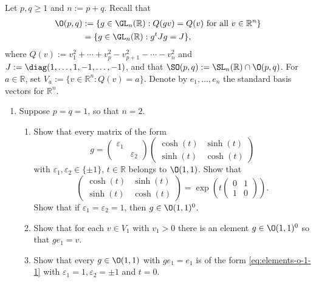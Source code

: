 \documentclass[reqno]{amsart} 
\def\eps{\varepsilon}
\begin{document}
\begin{homework}\label{hw:2}
  Let $p, q \geq 1$ and $n := p + q$.  Recall that
  \begin{align*}
    \O(p,q) &:= \{g \in \GL_n(\mathbb{R}) : Q(g v) = Q(v)
              \text{ for all } v \in \mathbb{R}^n\} \\
            &=
              \{g \in \GL_n(\mathbb{R}): g^t J g = J \},
  \end{align*}
  where $Q(v) := v_1^2 + \dotsb + v_p^2 - v_{p+1}^2 - \dotsb - v_n^2$ and $J := \diag(1,\dotsc,1,-1,\dotsc,-1)$, and that $\SO(p,q) := \SL_n(\mathbb{R}) \cap \O(p,q)$.  For $a \in \mathbb{R}$, set $V_a := \{v \in \mathbb{R}^n : Q(v) = a\}$.  Denote by $e_1,\dotsc,e_n$ the standard basis vectors for $\mathbb{R}^n$.
  \begin{enumerate}
  \item Suppose $p = q = 1$, so that $n = 2$.
    \begin{enumerate}
    \item Show that every matrix of the form
      \begin{equation}\label{eq:elements-o-1-1}
        g = 
        \begin{pmatrix}
          \eps_1 &  \\
                 & \eps_2
        \end{pmatrix}
        \begin{pmatrix}
          \cosh(t) & \sinh(t) \\
          \sinh(t) & \cosh(t)
        \end{pmatrix}
      \end{equation}
      with $\eps_1,\eps_2 \in \{\pm 1\}$, $t \in \mathbb{R}$ belongs to $\O(1,1)$.  Show that
      \begin{equation*}
        \begin{pmatrix}
          \cosh(t) & \sinh(t) \\
          \sinh(t) & \cosh(t)
        \end{pmatrix}
        = \exp (t 
\begin{pmatrix}
          0 & 1 \\
          1 & 0
        \end{pmatrix}
).
      \end{equation*}
      Show that if $\eps_1 = \eps_2 = 1$, then $g \in \O(1,1)^0$.
    \item Show that for each $v \in V_1$ with $v_1 > 0$ there is an element $g \in \O(1,1)^0$ so that $g e_1 = v$.
    \item Show that every $g \in \O(1,1)$ with $g e_1 = e_1$ is of the form \eqref{eq:elements-o-1-1} with $\eps_1 = 1, \eps_2 = \pm 1$ and $t = 0$.

\end{enumerate}
\end{enumerate}
\end{homework}
\end{document}
